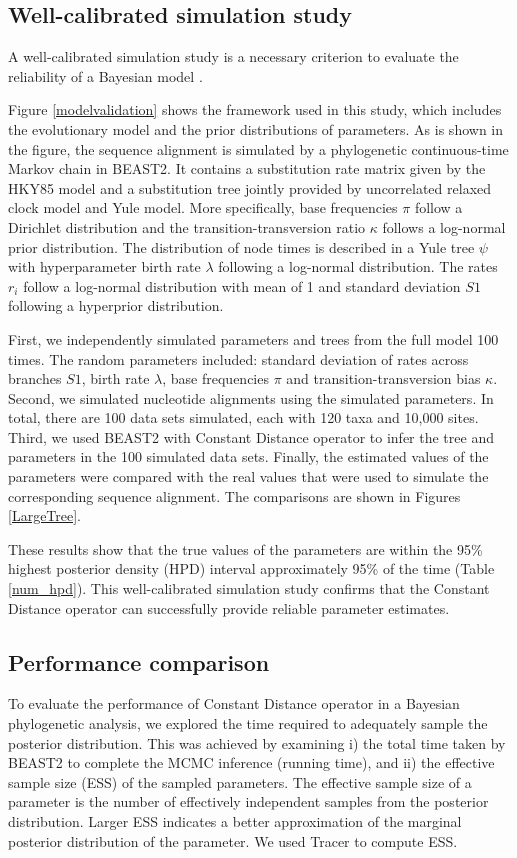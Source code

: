 \documentclass{bmcart}
\begin{document}
\subsection*{Well-calibrated simulation study}
A well-calibrated simulation study is a necessary criterion to evaluate the reliability of a Bayesian model \cite{dawid1982well}.

Figure \ref{modelvalidation} shows the framework used in this study, which includes the evolutionary model and the prior distributions of parameters. As is shown in the figure, the sequence alignment is simulated by a phylogenetic continuous-time Markov chain in BEAST2. It contains a substitution rate matrix given by the HKY85 \cite{hasegawa1985dating} model and a substitution tree jointly provided by uncorrelated relaxed clock model and Yule model. More specifically, base frequencies $\pi$ follow a Dirichlet distribution and the transition-transversion ratio $\kappa$ follows a log-normal prior distribution. The distribution of node times is described in a Yule tree $\psi$ with hyperparameter birth rate $\lambda $ following a log-normal distribution. The rates $r_i$ follow a log-normal distribution with mean of 1 and standard deviation $S1$ following a hyperprior distribution.

First, we independently simulated parameters and trees from the full model 100 times. The random parameters included: standard deviation of rates across branches $S1$, birth rate $\lambda $, base frequencies $\pi$ and transition-transversion bias $\kappa$. Second, we simulated nucleotide alignments using the simulated parameters. In total, there are 100 data sets simulated, each with 120 taxa and 10,000 sites. Third, we used BEAST2 with Constant Distance operator to infer the tree and parameters in the 100 simulated data sets. Finally, the estimated values of the parameters were compared with the real values that were used to simulate the corresponding sequence alignment. The comparisons are shown in Figures \ref{LargeTree}.

These results show that the true values of the parameters are within the 95\% highest posterior density (HPD) interval approximately 95\% of the time (Table \ref{num_hpd}). This well-calibrated simulation study confirms that the Constant Distance operator can successfully provide reliable parameter estimates.

\subsection*{Performance comparison}
To evaluate the performance of Constant Distance operator in a Bayesian phylogenetic analysis, we explored the time required to adequately sample the posterior distribution. This was achieved by examining i) the total time taken by BEAST2 to complete the MCMC inference (running time), and ii) the effective sample size (ESS) of the sampled parameters. The effective sample size of a parameter is the number of effectively independent samples from the posterior distribution. Larger ESS indicates a better approximation of the marginal posterior distribution of the parameter. We used Tracer \cite{Tracer} to compute ESS.
\end{document}
